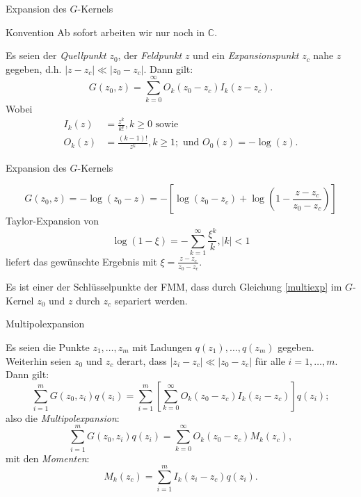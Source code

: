 \documentclass[ngerman]{beamer}
\begin{document}
\begin{frame}{Expansion des $G$-Kernels}
\normalsize
\begin{alertblock}{Konvention}
Ab sofort arbeiten wir nur noch in $\mathbb{C}$.
\end{alertblock}
\begin{Lemma}
Es seien der \emph{Quellpunkt} $z_0$, der \emph{Feldpunkt} $z$ und ein \emph{Expansionspunkt} $z_c$ nahe $z$ gegeben, d.h. $|z-z_c| \ll |z_0-z_c|$. Dann gilt: 
\begin{equation}\label{multiexp}
G(z_0,z) = \sum_{k=0}^\infty {O_k(z_0-z_c)I_k(z-z_c)}.
\end{equation}
Wobei 
\begin{align*}
 \nonumber
I_k(z)&=\frac{z^k}{k!}, k\geq 0 \text{ sowie } \\ 
O_k(z)&=\frac{(k-1)!}{z^k}, k\geq 1; \text{ und } O_0(z)=-\log(z).
\end{align*}
\end{Lemma}
\end{frame}

\begin{frame}{Expansion des $G$-Kernels}
\begin{Beweis}
\[
G(z_0,z) = -\log(z_0-z) = -\left[\log(z_0-z_c) + \log \left(1-\frac{z-z_c}{z_0-z_c}\right)\right]
\]
Taylor-Expansion von \[\log(1-\xi) = -\sum_{k=1}^\infty {\frac{\xi^k}{k} }, |k| < 1\] liefert das gewünschte Ergebnis mit $\xi = \frac{z-z_c}{z_0-z_c}$.
\end{Beweis}
\begin{alertblock}{}
Es ist einer der Schlüsselpunkte der FMM, dass durch Gleichung \eqref{multiexp} im $G$-Kernel $z_0$ und $z$ durch $z_c$ separiert werden.
\end{alertblock}
\end{frame}

\begin{frame}{Multipolexpansion}
\small
\begin{Satz}[Multipolexpansion]
Es seien die Punkte $z_1,\ldots, z_m$ mit Ladungen $q(z_1),\ldots,q(z_m)$ gegeben. Weiterhin seien $z_0$ und $z_c$ derart, dass $|z_i-z_c| \ll |z_0-z_c|$ für alle $i=1,\ldots,m$. Dann gilt:
\begin{equation}\nonumber
\sum_{i=1}^m {G(z_0,z_i)q(z_i)} = \sum_{i=1}^m \left[\sum_{k=0}^\infty O_k(z_0-z_c)I_k(z_i-z_c)\right] q(z_i);
\end{equation}
also die \emph{Multipolexpansion}:
\begin{equation}\label{multipolexp}
\sum_{i=1}^m {G(z_0,z_i)q(z_i)} = \sum_{k=0}^\infty O_k(z_0-z_c)M_k(z_c),
\end{equation}
mit den \emph{Momenten}:
\begin{equation}\label{moments}
M_k(z_c) =  \sum_{i=1}^m I_k(z_i-z_c) q(z_i).
\end{equation}
\end{Satz}
\end{frame}
\end{document}
